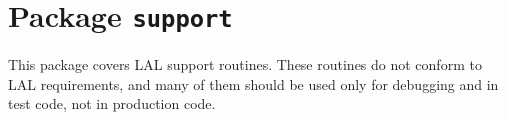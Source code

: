 \chapter{Package \texttt{support}}

This package covers LAL support routines.  These routines do not conform to
LAL requirements, and many of them should be used only for debugging and in
test code, not in production code.

\newpage
\newpage
\newpage
\newpage
\newpage
\newpage
